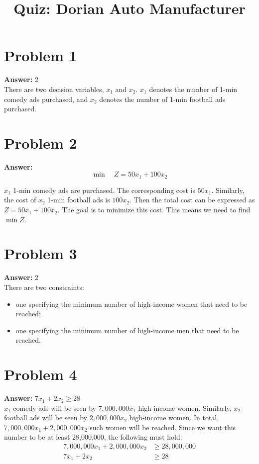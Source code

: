 \documentclass[11pt]{article}
\date{}
\title{Quiz: Dorian Auto Manufacturer}
\begin{document}
\thispagestyle{empty}
\pagestyle{empty}
\section*{Problem 1}
\label{sec:org88ebc8c}

\textbf{Answer:} 2\\

There are two decision variables, \(x_1\) and \(x_2\). \(x_1\) denotes the
number of 1-min comedy ads purchased, and \(x_2\) denotes the number of 1-min
football ads purchased.
\section*{Problem 2}
\label{sec:org02eaf4f}

\textbf{Answer:}
\begin{equation*}
\min\quad Z=50x_1+100x_2
\end{equation*}
\vspace{0.1cm}

\(x_1\) 1-min comedy ads are purchased. The corresponding cost is \(50x_1\).
Similarly, the cost of \(x_2\) 1-min football ads is \(100x_2\). Then the
total cost can be expressed as \(Z=50x_1+100x_2\). The goal is to minimize
this cost. This means we need to find \(\min Z\).
\section*{Problem 3}
\label{sec:org590794a}

\textbf{Answer:} 2\\

There are two constraints:
\begin{itemize}
\item one specifying the minimum number of high-income women that need to be reached;
\item one specifying the minimum number of high-income men that need to be reached.
\end{itemize}
\section*{Problem 4}
\label{sec:orgb8ba64c}

\textbf{Answer:} \(7x_1+2x_2\geq 28\)\\

\(x_1\) comedy ads will be seen by \(7,000,000x_1\) high-income women.
Similarly, \(x_2\) football ads will be seen by \(2,000,000x_2\) high-income
women. In total, \(7,000,000x_1+2,000,000x_2\) such women will be reached.
Since we want this number to be at least 28,000,000, the following must hold:
\begin{align*}
  7,000,000x_1+2,000,000x_2&\geq 28,000,000\\
  7x_1+2x_2&\geq 28
\end{align*}
\end{document}
